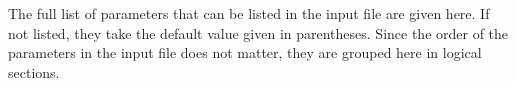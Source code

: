%
%
%
%
\label{app-param}

The full list of parameters that can be listed in the input file are
given here. If not listed, they take the default value given in
parentheses. Since the order of the parameters in the input file does
not matter, they are grouped here in logical sections.

